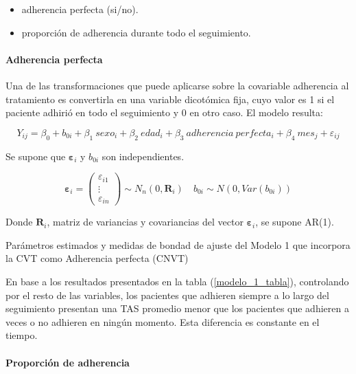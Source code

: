 \documentclass[spanish]{article}
\numberwithin{figure}{subsection}
\numberwithin{equation}{subsection}
\numberwithin{table}{subsection}
\begin{document}
\begin{itemize}
	\item adherencia perfecta (si/no).
	\item proporción de adherencia durante todo el seguimiento.
\end{itemize}

\paragraph{Adherencia perfecta} \mbox{}

Una de las transformaciones que puede aplicarse sobre la covariable adherencia
al tratamiento es convertirla en una variable dicotómica fija, cuyo valor es 1
si el paciente adhirió en todo el seguimiento y 0 en otro caso. El modelo
resulta:

\begin{equation}
	\label{modelo_1}
	Y_{ij} = \beta_0 + b_{0i} + \beta_1\ sexo_i + \beta_2\ edad_i + \beta_3\ adherencia\ perfecta_i
	+ \beta_4\ mes_j + \varepsilon_{ij}
\end{equation}

Se supone que $\bm{\varepsilon}_i$ y $b_{0i}$ son independientes.

\[ 
	\bm{\varepsilon}_i = \begin{pmatrix} \varepsilon_{i1} \\ \vdots \\ \varepsilon_{in} \end{pmatrix} \sim N_{n}(0, \bm{R}_i)
	\quad
	b_{0i} \sim N(0, Var(b_{0i}))
\]

Donde $\bm{R}_i$, matriz de variancias y covariancias del vector
$\bm{\varepsilon}_{i}$, se supone AR(1).

\begin{table}[H]
	\centering
	\caption{Parámetros estimados y medidas de bondad de ajuste del Modelo 1 que incorpora la CVT como Adherencia perfecta (CNVT)}
	\label{modelo_1_tabla}
	
\end{table}

En base a los resultados presentados en la tabla (\ref{modelo_1_tabla}),
controlando por el resto de las variables, los pacientes que adhieren siempre a
lo largo del seguimiento presentan una TAS promedio menor que los pacientes que
adhieren a veces o no adhieren en ningún momento. Esta diferencia es constante
en el tiempo.

\paragraph{Proporción de adherencia} \mbox{}
\end{document}
